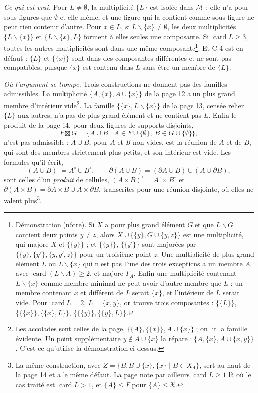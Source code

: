 \documentclass[11pt,a4paper]{article}
\begin{document}
\emph{Ce qui est vrai.} Pour $L \neq \emptyset$, la multiplicité $\{L\}$ est
isolée dans $\mathcal{M}$ : elle n'a pour sous-figures que $\emptyset$ et
elle-même, et une figure qui la contient comme sous-figure ne peut rien
contenir d'autre. Pour $x \in L$, si $L \smallsetminus \{x\} \neq \emptyset$, les
deux multiplicités $\{L \smallsetminus \{x\}\}$ et $\{L \smallsetminus \{x\},
L\}$ forment à elles seules une composante. Si $\operatorname{card} L \geq 3$,
toutes les autres multiplicités sont dans une même composante\footnote{Démonstration
(nôtre). Si $X$ a pour plus grand élément $G$ et que $L \smallsetminus G$
contient deux points $y \neq z$, alors $X \cup \{\{y\}, G \cup \{y, z\}\}$ est
une multiplicité, qui majore $X$ et $\{\{y\}\}$ ; et $\{\{y\}\}$, $\{\{y'\}\}$ sont
majorées par $\{\{y\}, \{y'\}, \{y, y', z\}\}$ pour un troisième point $z$. Une
multiplicité de plus grand élément $L$ ou $L \smallsetminus \{x\}$ qui n'est pas
l'une des trois exceptions a un membre $A$ avec $\operatorname{card}(L
\smallsetminus A) \geq 2$, et majore $F_{A}$. Enfin une multiplicité contenant
$L \smallsetminus \{x\}$ comme membre minimal ne peut avoir d'autre membre que
$L$ : un membre contenant $x$ et différent de $L$ serait $\{x\}$, et
l'intérieur de $L$ serait vide. Pour $\operatorname{card} L = 2$, $L = \{x,
y\}$, on trouve trois composantes : $\{\{L\}\}$, $\{\{\{x\}\}, \{\{x\},L\}\}$,
$\{\{\{y\}\}, \{\{y\},L\}\}$.}. Et C 4 est en défaut : $\{L\}$ et $\{\{x\}\}$
sont dans des composantes différentes et ne sont pas compatibles, puisque
$\{x\}$ est contenu dans $L$ sans être un membre de $\{L\}$.

\emph{Où l'argument se trompe.} Trois constructions ne donnent pas des familles
admissibles. La multiplicité $\{A, \{x\}, A \cup \{x\}\}$ de la page 12 a un
plus grand membre d'intérieur vide\footnote{Les accolades sont celles de la page,
$\{\{A\}, \{\{x\}\}, A \cup \{x\}\}$ ; on lit la famille évidente. Un point
supplémentaire $y \notin A \cup \{x\}$ la répare : $\{A, \{x\}, A \cup \{x,
y\}\}$. C'est ce qu'utilise la démonstration ci-dessus.}. La famille $\{\{x\}, L
\smallsetminus \{x\}\}$ de la page 13, censée relier $\{L\}$ aux autres, n'a pas
de plus grand élément et ne contient pas $L$. Enfin le produit de la page 14,
pour deux figures de supports disjoints,
\[
F \boxtimes G = \{A \cup B \mid A \in F \cup \{\emptyset\},\ B \in G \cup
\{\emptyset\}\},
\]
n'est pas admissible : $A \cup B$, pour $A$ et $B$ non vides, est la réunion de
$A$ et de $B$, qui sont des membres strictement plus petits, et son intérieur
est vide. Les formules qu'il écrit,
\[
(A \cup B)^{\circ} = A^{\circ} \cup B^{\circ}, \qquad \partial(A \cup B) =
(\partial A \cup B) \cup (A \cup \partial B),
\]
sont celles d'un \emph{produit} de cellules, $(A \times B)^{\circ} = A^{\circ}
\times B^{\circ}$ et $\partial(A \times B) = \partial A \times B \cup A \times
\partial B$, transcrites pour une réunion disjointe, où elles ne valent
plus\footnote{La même construction, avec $Z = \{B, B \cup \{x\}, \{x\} \mid B
\in X_{A}\}$, sert au haut de la page 14 et a le même défaut. La page note par
ailleurs $\operatorname{card} L \geq 1$ là où le cas traité est
$\operatorname{card} L > 1$, et $\{A\} \leq F$ pour $\{A\} \leq
\mathfrak{X}$.}.
\end{document}
